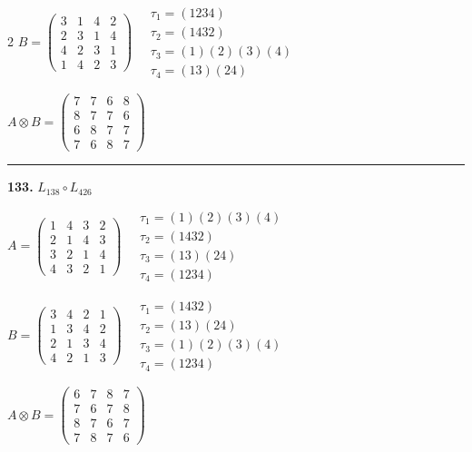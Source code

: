 \begin{multicols}{2}
$B = \begin{pmatrix} 3 & 1 & 4 & 2 \\ 2 & 3 & 1 & 4 \\ 4 & 2 & 3 & 1 \\ 1 & 4 & 2 & 3 \end{pmatrix} \quad \begin{matrix} \tau_{1}=(1 2 3 4) \\ \tau_{2}=(1 4 3 2) \\ \tau_{3}=(1)(2)(3)(4) \\ \tau_{4}=(1 3)(2 4) \end{matrix}$

$A \otimes B = \begin{pmatrix} 7 & 7 & 6 & 8 \\ 8 & 7 & 7 & 6 \\ 6 & 8 & 7 & 7 \\ 7 & 6 & 8 & 7 \end{pmatrix}$

\vspace{0.3em}
\hrule
\vspace{0.3em}

\noindent\textbf{133.} $L_{138} \circ L_{426}$

$A = \begin{pmatrix} 1 & 4 & 3 & 2 \\ 2 & 1 & 4 & 3 \\ 3 & 2 & 1 & 4 \\ 4 & 3 & 2 & 1 \end{pmatrix} \quad \begin{matrix} \tau_{1}=(1)(2)(3)(4) \\ \tau_{2}=(1 4 3 2) \\ \tau_{3}=(1 3)(2 4) \\ \tau_{4}=(1 2 3 4) \end{matrix}$

$B = \begin{pmatrix} 3 & 4 & 2 & 1 \\ 1 & 3 & 4 & 2 \\ 2 & 1 & 3 & 4 \\ 4 & 2 & 1 & 3 \end{pmatrix} \quad \begin{matrix} \tau_{1}=(1 4 3 2) \\ \tau_{2}=(1 3)(2 4) \\ \tau_{3}=(1)(2)(3)(4) \\ \tau_{4}=(1 2 3 4) \end{matrix}$

$A \otimes B = \begin{pmatrix} 6 & 7 & 8 & 7 \\ 7 & 6 & 7 & 8 \\ 8 & 7 & 6 & 7 \\ 7 & 8 & 7 & 6 \end{pmatrix}$


\end{multicols}
